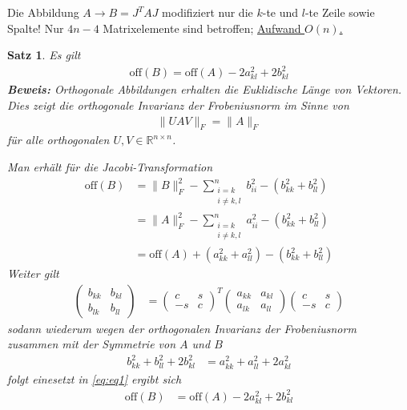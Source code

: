 \documentclass[%
a4paper,
11pt,		%
]
{scrartcl}
\newcommand{\R}{\mathbb{R}}
\newcommand{\off}{\text{off}}
\theoremstyle{plain}
\theoremstyle{plain}
\newtheorem{mysatz}[mydef]{Satz}
\theoremstyle{plain}
\theoremstyle{plain}
\begin{document}
Die Abbildung $A \rightarrow B = J^T A J$ modifiziert nur die $k$-te und $l$-te Zeile sowie Spalte! Nur $4n-4$ Matrixelemente sind betroffen; \uline{Aufwand $O(n)$.}

\newpage

\begin{mysatz}
Es gilt
\begin{align*}
  \off(B) = \off(A) - 2 a_{kl}^2 + 2b_{kl}^2 
\end{align*}
\textbf{Beweis:}
Orthogonale Abbildungen erhalten die Euklidische Länge von Vektoren. Dies zeigt die orthogonale Invarianz der Frobeniusnorm im Sinne von
\begin{align*}
\|UAV\|_F = \|A\|_F
\end{align*}
für alle orthogonalen $U,V \in \R^{n \times n}$.

Man erhält für die Jacobi-Transformation
\begin{align*}
  \off(B)   & = \|B\|_F^2 - \sum\limits_{\substack{i=k\\ i \neq k,l}}^n b_{ii}^2 - \left( b_{kk}^2 + b_{ll}^2 \right)\\
            & = \|A\|_F^2 - \sum\limits_{\substack{i=k\\ i \neq k,l}}^n a_{ii}^2 - \left( b_{kk}^2 + b_{ll}^2 \right)\\
            & = \off(A) + (a_{kk}^2 + a_{ll}^2) - (b_{kk}^2+b_{ll}^2)\label{eq:eq1}\tag{1}
\end{align*}
Weiter gilt
\begin{align*}
\begin{pmatrix}
b_{kk} & b_{kl}\\
b_{lk} & b_{ll}
\end{pmatrix}
& = 
\begin{pmatrix}
c & s\\
-s & c
\end{pmatrix}^T
\begin{pmatrix}
a_{kk} & a_{kl}\\
a_{lk} & a_{ll}
\end{pmatrix}
\begin{pmatrix}
c & s\\
-s & c
\end{pmatrix}
\end{align*}
sodann wiederum wegen der orthogonalen Invarianz der Frobeniusnorm zusammen mit der Symmetrie von $A$ und $B$
\begin{align*}
b_{kk}^2 + b_{ll}^2 + 2b_{kl}^2 & = a_{kk}^2 + a_{ll}^2 + 2a_{kl}^2
\end{align*}
folgt einesetzt in \eqref{eq:eq1} ergibt sich
\begin{align*}
\off(B) & = \off(A) - 2a_{kl}^2 + 2b_{kl}^2
\end{align*}
\end{mysatz}
\end{document}
